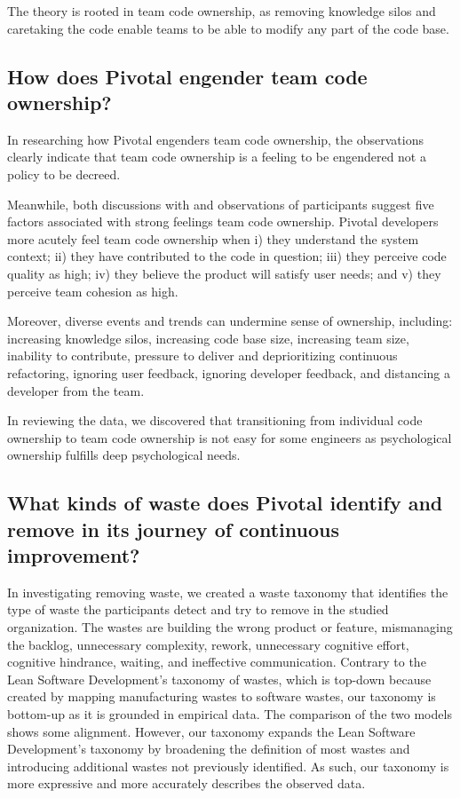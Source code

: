 The theory is rooted in team code ownership, as removing knowledge silos and caretaking the code enable teams to be able to modify any part of the code base. 


\subsection{How does Pivotal engender team code ownership?}
In researching how Pivotal engenders team code ownership, the observations clearly indicate that team code ownership is a feeling to be engendered not a policy to be decreed.


Meanwhile, both discussions with and observations of participants suggest five factors associated with strong feelings team code ownership. Pivotal developers more acutely feel team code ownership when i) they understand the system context; ii) they have contributed to the code in question; iii) they perceive code quality as high; iv) they believe the product will satisfy user needs; and v) they perceive team cohesion as high.


Moreover, diverse events and trends can undermine sense of ownership, including: increasing knowledge silos, increasing code base size, increasing team size, inability to contribute, pressure to deliver and deprioritizing continuous refactoring, ignoring user feedback, ignoring developer feedback, and distancing a developer from the team.


In reviewing the data, we discovered that transitioning from individual code ownership to team code ownership is not easy for some engineers as psychological ownership fulfills deep psychological needs.


\subsection{What kinds of waste does Pivotal identify and remove in its journey of continuous improvement? }


In investigating removing waste, we created a waste taxonomy that identifies the type of waste the participants detect and try to remove in the studied organization. The wastes are building the wrong product or feature, mismanaging the backlog, unnecessary complexity, rework, unnecessary cognitive effort, cognitive hindrance, waiting, and ineffective communication. 
Contrary to the Lean Software Development's taxonomy of wastes, which is top-down because created by mapping manufacturing wastes to software wastes, our taxonomy is bottom-up as it is grounded in empirical data. The comparison of the two models shows some alignment. However, our taxonomy expands the Lean Software Development's taxonomy by broadening the definition of most wastes and introducing additional wastes not previously identified. As such, our taxonomy is more expressive and more accurately describes the observed data.


